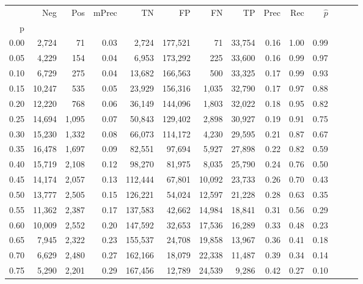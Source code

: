\begin{tabular}{rrrrrrrrrrrrrr}
\toprule
{} &     Neg &    Pos & mPrec &       TN &       FP &      FN &      TP &  Prec &   Rec & $\hat{p}$ \\
p    &         &        &       &          &          &         &         &       &       &           \\
\midrule
0.00 &   2,724 &     71 &  0.03 &    2,724 &  177,521 &      71 &  33,754 &  0.16 &  1.00 &      0.99 \\
0.05 &   4,229 &    154 &  0.04 &    6,953 &  173,292 &     225 &  33,600 &  0.16 &  0.99 &      0.97 \\
0.10 &   6,729 &    275 &  0.04 &   13,682 &  166,563 &     500 &  33,325 &  0.17 &  0.99 &      0.93 \\
0.15 &  10,247 &    535 &  0.05 &   23,929 &  156,316 &   1,035 &  32,790 &  0.17 &  0.97 &      0.88 \\
0.20 &  12,220 &    768 &  0.06 &   36,149 &  144,096 &   1,803 &  32,022 &  0.18 &  0.95 &      0.82 \\
0.25 &  14,694 &  1,095 &  0.07 &   50,843 &  129,402 &   2,898 &  30,927 &  0.19 &  0.91 &      0.75 \\
0.30 &  15,230 &  1,332 &  0.08 &   66,073 &  114,172 &   4,230 &  29,595 &  0.21 &  0.87 &      0.67 \\
0.35 &  16,478 &  1,697 &  0.09 &   82,551 &   97,694 &   5,927 &  27,898 &  0.22 &  0.82 &      0.59 \\
0.40 &  15,719 &  2,108 &  0.12 &   98,270 &   81,975 &   8,035 &  25,790 &  0.24 &  0.76 &      0.50 \\
0.45 &  14,174 &  2,057 &  0.13 &  112,444 &   67,801 &  10,092 &  23,733 &  0.26 &  0.70 &      0.43 \\
0.50 &  13,777 &  2,505 &  0.15 &  126,221 &   54,024 &  12,597 &  21,228 &  0.28 &  0.63 &      0.35 \\
0.55 &  11,362 &  2,387 &  0.17 &  137,583 &   42,662 &  14,984 &  18,841 &  0.31 &  0.56 &      0.29 \\
0.60 &  10,009 &  2,552 &  0.20 &  147,592 &   32,653 &  17,536 &  16,289 &  0.33 &  0.48 &      0.23 \\
0.65 &   7,945 &  2,322 &  0.23 &  155,537 &   24,708 &  19,858 &  13,967 &  0.36 &  0.41 &      0.18 \\
0.70 &   6,629 &  2,480 &  0.27 &  162,166 &   18,079 &  22,338 &  11,487 &  0.39 &  0.34 &      0.14 \\
0.75 &   5,290 &  2,201 &  0.29 &  167,456 &   12,789 &  24,539 &   9,286 &  0.42 &  0.27 &      0.10 \\

\end{tabular}
